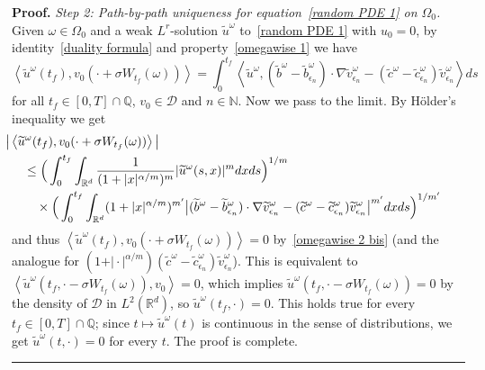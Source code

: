 \documentclass[a4paper,10pt]{article}
\newenvironment{proof}[1][Proof]{\noindent\textbf{#1.} }{\ \rule{0.5em}{0.5em}}
\begin{document}
\begin{proof}
\emph{Step 2: Path-by-path uniqueness for equation~\eqref{random PDE 1} on $\Omega_{0}$.} Given $\omega\in\Omega_{0}$ and a weak $L^{r}$-solution $\widetilde{u}^\omega$ to~\eqref{random PDE 1} with
$u_{0}=0$, by identity~\eqref{duality formula} and property~\eqref{omegawise 1} we have
\[
\left\langle \widetilde{u}^\omega (t_{f})  ,v_{0}(
\cdot+\sigma W_{t_{f}}(\omega) )  \right\rangle =\int_{0}^{t_{f}}\left\langle \widetilde{u}^\omega,( \widetilde{b}^\omega  -\widetilde{b}_{\epsilon_{n}}^\omega )
\cdot\nabla\widetilde{v}_{\epsilon_{n}}^\omega  -(
\widetilde{c}^\omega  -\widetilde{c}_{\epsilon_{n}
}^\omega )  \widetilde{v}_{\epsilon_{n}}^\omega  \right\rangle ds
\]
for all $t_{f}\in [0,T] \cap\mathbb{Q}$, $v_{0}\in\mathcal{D}$
and $n\in\mathbb{N}$. Now we pass to the limit. By H\"older's inequality we get
\begin{align*}
\lefteqn{\hspace{-0.5cm} \big\vert \left\langle \widetilde{u}^\omega (t_{f})
,v_{0}(\cdot+\sigma W_{t_{f}}(\omega))\right\rangle \big\vert } \\
&  \leq \Big( \int_{0}^{t_{f}}\int_{\mathbb{R}^{d}}\frac{1}{(
1+\vert x \vert^{\alpha/m} )^{m}} \vert \widetilde{u}^\omega(s,x) \vert^{m}dxds \Big)  ^{1/m}\\
& \quad {} \times \Big( \int_{0}^{t_{f}} \int_{\mathbb{R}^{d}} (1+\vert
x\vert^{\alpha/m})^{m^{\prime}} \big\vert (\widetilde{b}^\omega  -\widetilde{b}_{\epsilon_{n}}^\omega ) \cdot \nabla\widetilde{v}_{\epsilon_{n}}^\omega  -(  \widetilde{c}^\omega -\widetilde{c}_{\epsilon_{n}}^\omega )  \widetilde{v}
_{\epsilon_{n}}^\omega \big\vert^{m^{\prime}}dxds \Big)^{1/m^{\prime}}
\end{align*}
and thus $\left\langle \widetilde{u}^\omega(t_{f})
,v_{0}(\cdot+\sigma W_{t_{f}}(\omega))\right\rangle =0$ by~\eqref{omegawise 2 bis} (and the analogue for $( 1+ \vert \cdot \vert^{\alpha/m}) ( \widetilde{c}^\omega 
-\widetilde{c}_{\epsilon_{n}}^\omega ) \widetilde{v}_{\epsilon_{n}}^\omega$). This is equivalent to $\left\langle \widetilde{u}^\omega(t_{f},\cdot-\sigma W_{t_{f}}(\omega) )  ,v_{0}\right\rangle =0$, which implies $\widetilde{u}^\omega(t_{f},\cdot-\sigma W_{t_{f}}(
\omega))  =0$ by the density of $\mathcal{D}$ in $L^{2}(\mathbb{R}^{d})$, so $\widetilde{u}^\omega(t_{f},\cdot)  =0$. This holds true for every $t_{f}\in [0,T] \cap\mathbb{Q}$; since $t\mapsto \widetilde{u}^\omega(t)$ is continuous in the sense of distributions, we get $\widetilde{u}^\omega(t,\cdot) =0$ for every $t$. The proof is complete.
\end{proof}
\end{document}

